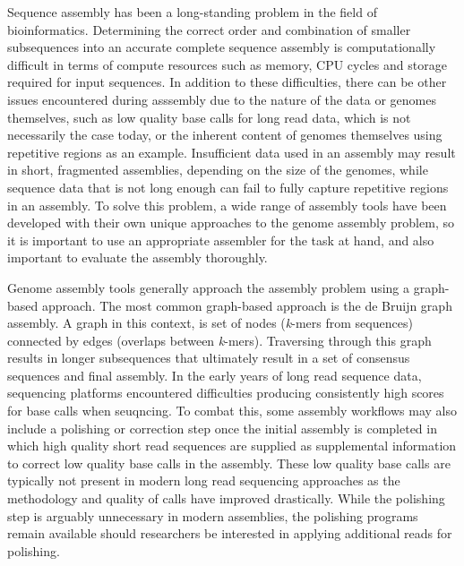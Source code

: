 Sequence assembly has been a long-standing problem in the field of
bioinformatics\cite{Nagarajan2013}. Determining the correct order and
combination of smaller subsequences into an accurate complete sequence
assembly is computationally difficult in terms of compute resources
such as memory, CPU cycles and storage required for input
sequences\cite{Nagarajan2013}. In addition to these difficulties,
there can be other issues encountered during asssembly due to the
nature of the data or genomes themselves, such as low quality base
calls for long read data, which is not necessarily the case today, or
the inherent content of genomes themselves using repetitive regions as
an example. Insufficient data used in an assembly may result in short,
fragmented assemblies, depending on the size of the genomes, while
sequence data that is not long enough can fail to fully capture
repetitive regions in an assembly. To solve this problem, a wide range
of assembly tools have been developed with their own unique approaches
to the genome assembly problem, so it is important to use an
appropriate assembler for the task at hand, and also important to
evaluate the assembly thoroughly.

Genome assembly tools generally approach the assembly problem using a
graph-based approach. The most common graph-based approach is the de
Bruijn graph assembly. A graph in this context, is set of nodes
(\textit{k}-mers from sequences) connected by edges (overlaps between
\textit{k}-mers). Traversing through this graph results in longer
subsequences that ultimately result in a set of consensus sequences
and final assembly. In the early years of long read sequence data,
sequencing platforms encountered difficulties producing consistently
high scores for base calls when seuqncing. To combat this, some
assembly workflows may also include a polishing or correction step
once the initial assembly is completed in which high quality short
read sequences are supplied as supplemental information to correct low
quality base calls in the assembly. These low quality base calls are
typically not present in modern long read sequencing approaches as the
methodology and quality of calls have improved drastically. While the
polishing step is arguably unnecessary in modern assemblies, the
polishing programs remain available should researchers be interested
in applying additional reads for polishing. 

